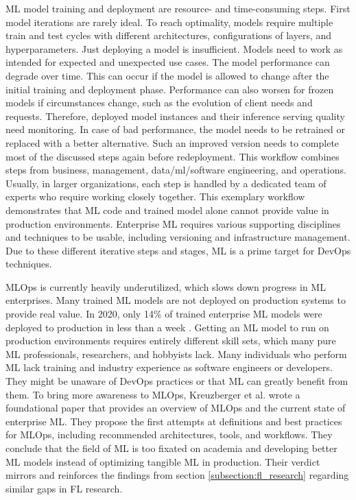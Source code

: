 ML model training and deployment are resource- and time-consuming steps.
First model iterations are rarely ideal.
To reach optimality, models require multiple train and test cycles with different architectures, configurations of layers, and hyperparameters.
Just deploying a model is insufficient.
Models need to work as intended for expected and unexpected use cases.
The model performance can degrade over time.
This can occur if the model is allowed to change after the initial training and deployment phase.
Performance can also worsen for frozen models if circumstances change, such as the evolution of client needs and requests.
Therefore, deployed model instances and their inference serving quality need monitoring.
In case of bad performance, the model needs to be retrained or replaced with a better alternative.
Such an improved version needs to complete most of the discussed steps again before redeployment.
This workflow combines steps from business, management, data/ml/software engineering, and operations.
Usually, in larger organizations, each step is handled by a dedicated team of experts who require working closely together.
This exemplary workflow demonstrates that ML code and trained model alone cannot provide value in production environments.
Enterprise ML requires various supporting disciplines and techniques to be usable, including versioning and infrastructure management.
Due to these different iterative steps and stages, ML is a prime target for DevOps techniques.

MLOps is currently heavily underutilized, which slows down progress in ML enterprises.
Many trained ML models are not deployed on production systems to provide real value.
In 2020, only 14\% of trained enterprise ML models were deployed to production in less than a week \cite{algorithmia_state_of_enterprise_ml}.
Getting an ML model to run on production environments requires entirely different skill sets, which many pure ML professionals, researchers, and hobbyists lack.
Many individuals who perform ML lack training and industry experience as software engineers or developers.
They might be unaware of DevOps practices or that ML can greatly benefit from them.
To bring more awareness to MLOps, Kreuzberger et al. wrote a foundational paper \cite{paper:mlops} that provides an overview of MLOps and the current state of enterprise ML.
They propose the first attempts at definitions and best practices for MLOps, including recommended architectures, tools, and workflows.
They conclude that the field of ML is too fixated on academia and developing better ML models instead of optimizing tangible ML in production.
Their verdict mirrors and reinforces the findings from section \ref{subsection:fl_research} regarding similar gaps in FL research.